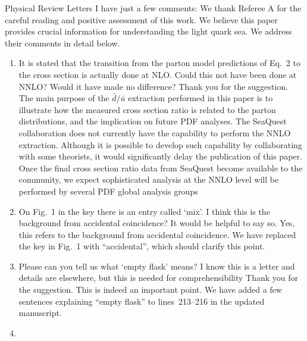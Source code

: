 \documentclass[letterpaper,12pt,oneside,final]{letter}
\makeatletter
\renewenvironment*{displayquote}
  {\begingroup\color{blue}\csq@getcargs{\csq@bdquote{}{}}}
  {\csq@edquote\endgroup}
\makeatother
\begin{document}
\begin{letter}{Physical Review Letters}
\begin{displayquote}
		I have just a few comments:
	\end{displayquote}
	We thank Referee A for the careful reading and positive assessment of this work.
	We believe this paper provides crucial information for understanding the light quark sea.
	We address their comments in detail below.
	\begin{enumerate}
		\item \begin{displayquote}
			      It is stated that the transition from the parton model predictions of
			      Eq.~2 to the cross section is actually done at NLO.
			      Could this not have been done at NNLO?
			      Would it have made no difference?
		      \end{displayquote}
			  Thank you for the suggestion.
			  The main purpose of the $\bar{d}/\bar{u}$ extraction performed in this paper is to illustrate how the measured
		      cross section ratio is related to the parton distributions, and the implication on future PDF analyses.
		      The SeaQuest collaboration does not currently have the capability to perform the NNLO extraction.
		      Although it is possible to develop such capability by collaborating with some theorists,
		      it would significantly delay the publication of this paper.
		      Once the final cross section ratio data from SeaQuest become available to the community,
		      we expect sophisticated analysis at the NNLO level will be performed by several PDF global analysis groups
		\item  \begin{displayquote}
			      On Fig.~1 in the key there is an entry called `mix'.
			      I think this is the background from accidental coincidence?
			      It would be helpful to say so.
		      \end{displayquote}
		      Yes, this refers to the background from accidental coincidence.
		      We have replaced the key in Fig.~1 with ``accidental'', which should clarify this point.
		\item \begin{displayquote}
			      Please can you tell us what `empty flask' means?
			      I know this is a letter and details are elsewhere,
			      but this is needed for comprehensibility
		      \end{displayquote}
		      Thank you for the suggestion. This is indeed an important point.
		      We have added a few sentences explaining ``empty flask'' to lines~213--216 in the updated manuscript.
		\item \begin{displayquote}

\end{displayquote}
\end{enumerate}
\end{letter}
\end{document}
